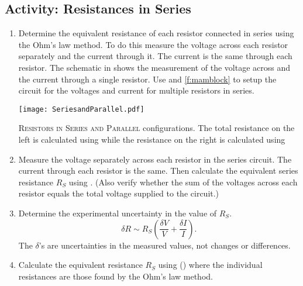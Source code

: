 \subsection{Activity: Resistances in Series} \label{s:series}
\begin{enumerate}
	\item \label{l:eqs} Determine the equivalent resistance of each resistor connected in series using the Ohm's law method. To do this measure the voltage across each resistor separately and the current through it. The current is the same through each resistor. The schematic in  shows the measurement of the voltage across and the current through a single resistor. Use  and \ref{f:mamblock} to setup the circuit for the voltages and current for multiple resistors in series.
	
\begin{marginfigure}
	\centering
	\texttt{[image: SeriesandParallel.pdf]}
	\caption[Series and Parallel Resistors]{\textsc{Resistors in Series and Parallel} configurations.  The total resistance on the left is calculated using  while the resistance on the right is calculated using }
	\label{f:resistor-series-par}
\end{marginfigure}

	\item Measure the voltage separately across each resistor in the series circuit. The current through each resistor is the same. Then calculate the equivalent series resistance $R_S$ using . (Also verify whether the sum of the voltages across each resistor equals the total voltage supplied to the circuit.)
	\item Determine the experimental uncertainty in the value of $R_S$. %
	\[ \delta R \sim R_S\left( \frac{\delta V}{V} + \frac{\delta I}{I} \right). \] The $\delta$'s are uncertainties in the measured values, not changes or differences.
	
	\item Calculate the equivalent resistance $R_S$ using () where the individual resistances are those found by the Ohm's law method. %
\end{enumerate}



